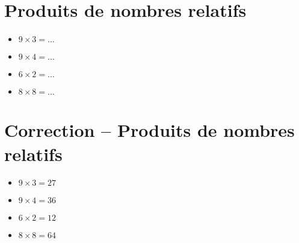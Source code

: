\documentclass[a4paper,11pt,fleqn]{article}
\begin{document}
\section{Produits de nombres relatifs}
\begin{itemize}

  \item $9\times3=\ldots$
  \item $9\times4=\ldots$
  \item $6\times2=\ldots$
  \item $8\times8=\ldots$
\end{itemize}

\section{Correction -- Produits de nombres relatifs}
\begin{itemize}

  \item $9\times3=27$
  \item $9\times4=36$
  \item $6\times2=12$
  \item $8\times8=64$
\end{itemize}
\end{document}
